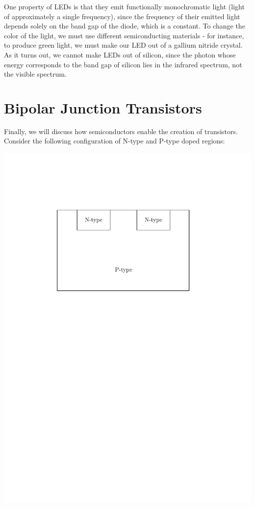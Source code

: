 \documentclass[letterpaper]{article}
\theoremstyle{remark}
\begin{document}
One property of LEDs is that they emit functionally monochromatic light (light of approximately a single frequency), since the frequency of their emitted light depends solely on the band gap of the diode, which is a constant. To change the color of the light, we must use different semiconducting materials - for instance, to produce green light, we must make our LED out of a gallium nitride crystal. As it turns out, we cannot make LEDs out of silicon, since the photon whose energy corresponds to the band gap of silicon lies in the infrared spectrum, not the visible spectrum.

\section{Bipolar Junction Transistors}
Finally, we will discuss how semiconductors enable the creation of transistors. Consider the following configuration of N-type and P-type doped regions:
\begin{center}
    \includegraphics[scale=0.7]{bipolar_transistor.pdf}
\end{center}
\end{document}
